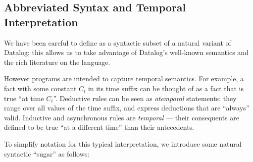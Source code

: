   


\subsection{Abbreviated Syntax and Temporal Interpretation}
\label{sec:abbrvsyntax}

We have been careful to define \slang as a syntactic subset of a
natural variant of Datalog; this allows us to take advantage of
Datalog's well-known semantics and the rich literature on the
language.

However \slang programs are intended to capture 
temporal semantics.  For example, a fact with some constant $C_i$ in its time
suffix can be thought of as a fact that is true ``at time $C_i$''.  Deductive
rules can be seen as {\em atemporal} statements: they range over all values of
the time suffix, and express deductions that are ``always'' valid.  Inductive
and asynchronous rules are {\em temporal} --- their consequents are defined to
be true ``at a different time'' than their antecedents. 

To simplify \slang notation for this typical interpretation,  we introduce
some natural syntactic ``sugar'' as follows:  

